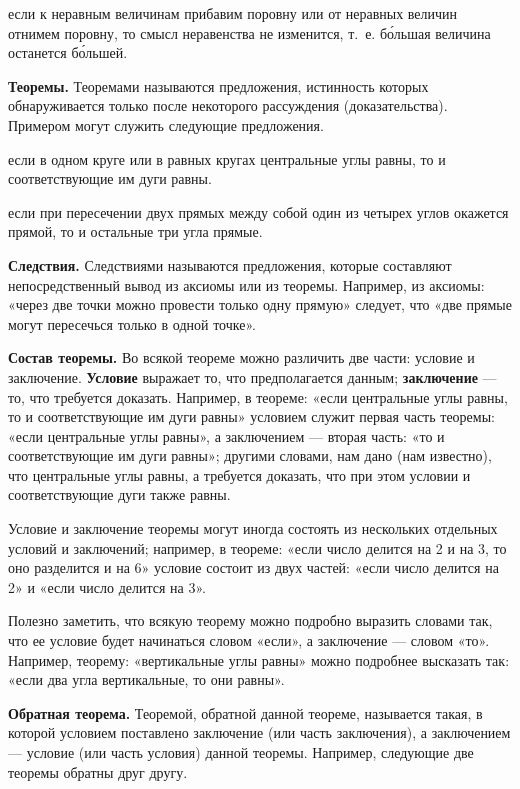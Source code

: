 \documentclass[oneside]{book}
\begin{document}
если к неравным величинам прибавим поровну или от неравных величин отнимем поровну, то смысл неравенства не изменится, т.~е. б\'{о}льшая величина останется б\'{о}льшей.

\textbf{Теоремы.}
Теоремами называются предложения, истинность которых обнаруживается только после некоторого рассуждения (доказательства).
Примером могут служить следующие предложения.

если в одном круге или в равных кругах центральные углы равны, то и соответствующие им дуги равны.

если при пересечении двух прямых между собой один из четырех углов окажется прямой, то и остальные три угла прямые.

\textbf{Следствия.}
Следствиями называются предложения, которые составляют непосредственный вывод из аксиомы или из теоремы.
Например, из аксиомы:
«через две точки можно провести только одну прямую» следует, что «две прямые могут пересечься только в одной точке».

\textbf{Состав теоремы.}
Во всякой теореме можно различить две части:
условие и заключение.
\textbf{Условие} выражает то, что предполагается данным;
\textbf{заключение} — то, что требуется доказать.
Например, в теореме:
«если центральные углы равны, то и соответствующие им дуги равны» условием служит первая часть теоремы:
«если центральные углы равны», а заключением — вторая часть:
«то и соответствующие им дуги равны»;
другими словами, нам дано (нам известно), что центральные углы равны, а требуется доказать, что при этом условии и соответствующие дуги также равны.

Условие и заключение теоремы могут иногда состоять из нескольких отдельных условий и заключений;
например, в теореме:
«если число делится на 2 и на 3, то оно разделится и на 6» условие состоит из двух частей:
«если число делится на 2» и «если число делится на 3».

Полезно заметить, что всякую теорему можно подробно выразить словами так, что ее условие будет начинаться словом «если», а заключение — словом «то».
Например, теорему:
«вертикальные углы равны» можно подробнее высказать так:
«если два угла вертикальные, то они равны».

\textbf{Обратная теорема.}
Теоремой, обратной данной теореме, называется такая, в которой условием поставлено заключение (или часть заключения), а заключением — условие (или часть условия) данной теоремы.
Например, следующие две теоремы обратны друг другу.

\medskip
\end{document}
